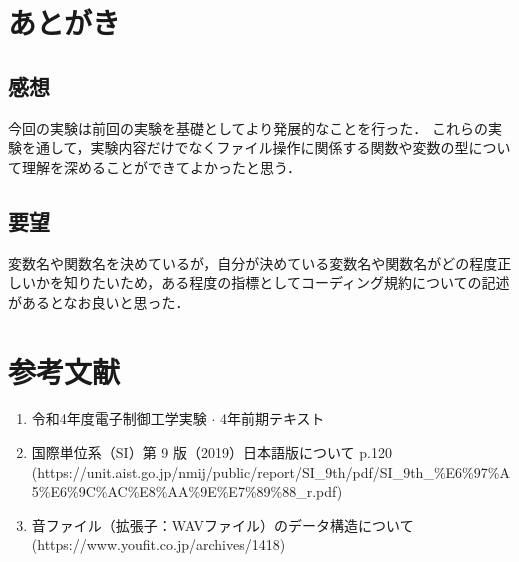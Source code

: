 \documentclass[titlepage]{jarticle}
\begin{document}
\section{あとがき}
\subsection{感想}
今回の実験は前回の実験を基礎としてより発展的なことを行った．
これらの実験を通して，実験内容だけでなくファイル操作に関係する関数や変数の型について理解を深めることができてよかったと思う．
\subsection{要望}
変数名や関数名を決めているが，自分が決めている変数名や関数名がどの程度正しいかを知りたいため，ある程度の指標としてコーディング規約についての記述があるとなお良いと思った．
\section*{参考文献}
\begin{enumerate}
  \item 令和4年度電子制御工学実験 $\cdot$ 4年前期テキスト
  \item 国際単位系（SI）第 9 版（2019）日本語版について p.120 (https://unit.aist.go.jp/nmij/public/report/SI\_9th/pdf/SI\_9th\_\%E6\%97\%A5\%E6\%9C\%AC\%E8\%AA\%9E\%E7\%89\%88\_r.pdf)
  \item 音ファイル（拡張子：WAVファイル）のデータ構造について(https://www.youfit.co.jp/archives/1418)
\end{enumerate}
\end{document}
